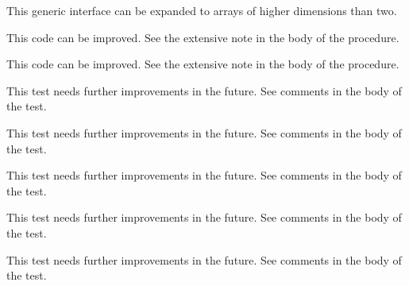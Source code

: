 \begin{DoxyRefList}
%
 This generic interface can be expanded to arrays of higher dimensions than two. 
\item[Subprogram \mbox{\hyperlink{namespaceSystem__mod_a8f999de90840ba33f9cf7f30edd41b3d}{System\+\_\+mod\+::copy\+File}} (path\+Old, path\+New, is\+Unix\+Shell, Err)]\label{todo__todo000083}%
%
 This code can be improved. See the extensive note in the body of the procedure.  
\item[Subprogram \mbox{\hyperlink{namespaceSystem__mod_acdbe0231b40135bc08ab285fc69f2b80}{System\+\_\+mod\+::get\+System\+Info}} (List, Err, OS, count, cache\+File)]\label{todo__todo000082}%
%
 This code can be improved. See the extensive note in the body of the procedure.  
\item[Subprogram \mbox{\hyperlink{namespaceTest__System__mod_a56a58918b2888e7ea0fa691de93cdeb3}{Test\+\_\+\+System\+\_\+mod\+::test\+\_\+\+Cmd\+Arg\+\_\+type\+\_\+1}} ()]\label{todo__todo000090}%
%
 This test needs further improvements in the future. See comments in the body of the test.  
\item[Subprogram \mbox{\hyperlink{namespaceTest__System__mod_a43fd8159ffe52170057e95d4e0c38d63}{Test\+\_\+\+System\+\_\+mod\+::test\+\_\+\+Env\+Var\+\_\+type\+\_\+1}} ()]\label{todo__todo000087}%
%
 This test needs further improvements in the future. See comments in the body of the test.  
\item[Subprogram \mbox{\hyperlink{namespaceTest__System__mod_ab0121f340538dae91c97cc5cdcba0a7b}{Test\+\_\+\+System\+\_\+mod\+::test\+\_\+\+Env\+Var\+\_\+type\+\_\+2}} ()]\label{todo__todo000088}%
%
 This test needs further improvements in the future. See comments in the body of the test.  
\item[Subprogram \mbox{\hyperlink{namespaceTest__System__mod_a26054fb4e3bf2d05710adc7965bc8431}{Test\+\_\+\+System\+\_\+mod\+::test\+\_\+\+Env\+Var\+\_\+type\+\_\+3}} ()]\label{todo__todo000089}%
%
 This test needs further improvements in the future. See comments in the body of the test.  
\item[Subprogram \mbox{\hyperlink{namespaceTest__System__mod_a8d37f80583c104a3dfb6b99a897feb26}{Test\+\_\+\+System\+\_\+mod\+::test\+\_\+execute\+Cmd\+\_\+1}} ()]\label{todo__todo000095}%
%
 This test needs further improvements in the future. See comments in the body of the test.  

\end{DoxyRefList}
